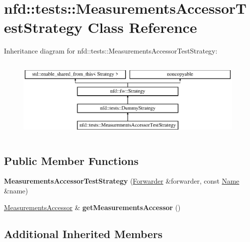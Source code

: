 \hypertarget{classnfd_1_1tests_1_1MeasurementsAccessorTestStrategy}{}\section{nfd\+:\+:tests\+:\+:Measurements\+Accessor\+Test\+Strategy Class Reference}
\label{classnfd_1_1tests_1_1MeasurementsAccessorTestStrategy}
Inheritance diagram for nfd\+:\+:tests\+:\+:Measurements\+Accessor\+Test\+Strategy\+:\begin{figure}[H]
\begin{center}
\leavevmode
\includegraphics[height=3.985765cm]{classnfd_1_1tests_1_1MeasurementsAccessorTestStrategy}
\end{center}
\end{figure}
\subsection*{Public Member Functions}
\begin{DoxyCompactItemize}
\item 
{\bfseries Measurements\+Accessor\+Test\+Strategy} (\hyperlink{classnfd_1_1Forwarder}{Forwarder} \&forwarder, const \hyperlink{classndn_1_1Name}{Name} \&name)\hypertarget{classnfd_1_1tests_1_1MeasurementsAccessorTestStrategy_a144539d684a8a7451370f251278a231e}{}\label{classnfd_1_1tests_1_1MeasurementsAccessorTestStrategy_a144539d684a8a7451370f251278a231e}

\item 
\hyperlink{classnfd_1_1MeasurementsAccessor}{Measurements\+Accessor} \& {\bfseries get\+Measurements\+Accessor} ()\hypertarget{classnfd_1_1tests_1_1MeasurementsAccessorTestStrategy_a8742deb31330a42f95cca7ae536f76a8}{}\label{classnfd_1_1tests_1_1MeasurementsAccessorTestStrategy_a8742deb31330a42f95cca7ae536f76a8}

\end{DoxyCompactItemize}
\subsection*{Additional Inherited Members}


